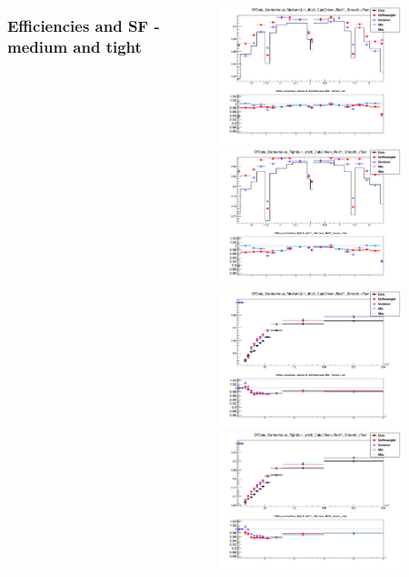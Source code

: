 \documentclass{beamer}
\begin{document}
\begin{frame}
\begin{columns}[t]
\frametitle{Efficiencies and SF - medium and tight}
\centering
\includegraphics[width=6cm,height=4cm]{Efficiencies_Eta_EB_Medium.png}\\
\includegraphics[width=6cm,height=4cm]{Efficiencies_Eta_EB_Tight.png}
\centering
\includegraphics[width=6cm,height=4cm]{Efficiencies_pT_EB_Medium.png}\\
\includegraphics[width=6cm,height=4cm]{Efficiencies_pT_EB_Tight.png}
\end{columns}
\end{frame}
\end{document}
